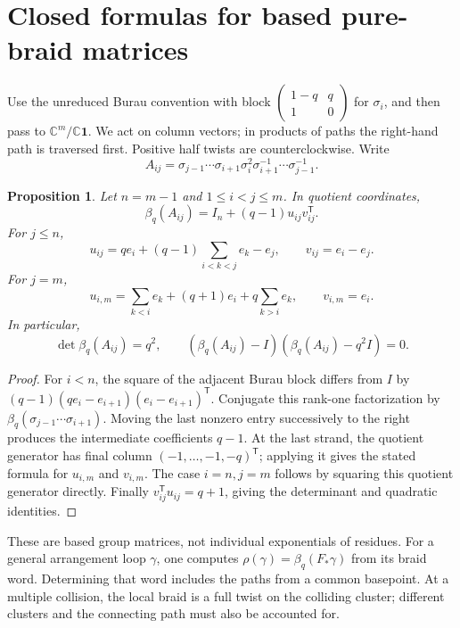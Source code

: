 \documentclass[11pt,a4paper]{article}
\newtheorem{proposition}[theorem]{Proposition}
\theoremstyle{remark}\newtheorem{remark}[theorem]{Remark}
\newcommand{\C}{\mathbb C}
\newcommand{\one}{\mathbf 1}
\begin{document}
\section{Closed formulas for based pure-braid matrices}
Use the unreduced Burau convention with block
$\left(\begin{smallmatrix}1-q&q\\1&0\end{smallmatrix}\right)$ for
$\sigma_i$, and then pass to $\C^m/\C\one$.  We act on column vectors;
in products of paths the right-hand path is traversed first.  Positive
half twists are counterclockwise.  Write
\[
A_{ij}=\sigma_{j-1}\cdots\sigma_{i+1}\sigma_i^2
       \sigma_{i+1}^{-1}\cdots\sigma_{j-1}^{-1}.
\]

\begin{proposition}\label{prop:pure}
Let $n=m-1$ and $1\le i<j\le m$.  In quotient coordinates,
\begin{equation}\label{eq:pure}
\beta_q(A_{ij})=I_n+(q-1)u_{ij}v_{ij}^{\mathsf T}.
\end{equation}
For $j\le n$,
\[
u_{ij}=q e_i+(q-1)\sum_{i<k<j}e_k-e_j,
\qquad v_{ij}=e_i-e_j.
\]
For $j=m$,
\[
u_{i,m}=\sum_{k<i}e_k+(q+1)e_i+q\sum_{k>i}e_k,
\qquad v_{i,m}=e_i.
\]
In particular,
\[
\det\beta_q(A_{ij})=q^2,\qquad
(\beta_q(A_{ij})-I)(\beta_q(A_{ij})-q^2I)=0.
\]
\end{proposition}
\begin{proof}
For $i<n$, the square of the adjacent Burau block differs from $I$ by
$(q-1)(q e_i-e_{i+1})(e_i-e_{i+1})^{\mathsf T}$.
Conjugate this rank-one factorization by
$\beta_q(\sigma_{j-1}\cdots\sigma_{i+1})$.
Moving the last nonzero entry successively to the right produces the
intermediate coefficients $q-1$.  At the last strand, the quotient
generator has final column $(-1,\ldots,-1,-q)^{\mathsf T}$; applying it
gives the stated formula for $u_{i,m}$ and $v_{i,m}$.
The case $i=n,j=m$ follows by squaring this quotient generator directly.
Finally $v_{ij}^{\mathsf T}u_{ij}=q+1$, giving the determinant and
quadratic identities.
\end{proof}

These are based group matrices, not individual exponentials of residues.
For a general arrangement loop $\gamma$, one computes
$\rho(\gamma)=\beta_q(F_*\gamma)$ from its braid word.  Determining that
word includes the paths from a common basepoint.  At a multiple collision,
the local braid is a full twist on the colliding cluster; different
clusters and the connecting path must also be accounted for.
\end{document}
